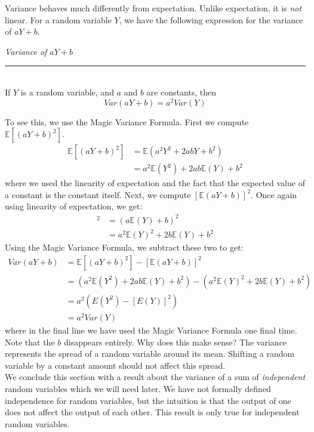 \documentclass[12pt]{article}
\theoremstyle{definition}
\theoremstyle{remark}
\def\E{{\mathbb E}}
\begin{document}
Variance behaves much differently from expectation. Unlike expectation, it is \emph{not} linear. For a random variable $Y$, we have the following expression for the variance of $aY + b$.

\begin{framed}
  \emph{Variance of $aY + b$}\\
  \rule{\dimexpr{}\fboxrule}{.1pt} \\
If $Y$ is a random variable, and $a$ and $b$ are constants, then
\[
Var(aY + b) = a^2 Var(Y)
\]
\end{framed}
To see this, we use the Magic Variance Formula. First we compute $\E[(aY + b)^2]$.
\begin{align*}
\E[(aY +b)^2] &= \E(a^2 Y^2 + 2 a b Y + b^2) \\
&= a^2 \E(Y^2) + 2 a b \E(Y) + b^2
\end{align*}
where we used the linearity of expectation and the fact that the expected value of a constant is the constant itself. Next, we compute $[\E(aY + b)]^2$. Once again using linearity of expectation, we get:
\begin{align*}
[\E(aY + b)]^2 &= (a\E(Y) + b)^2 \\
&= a^2 \E(Y)^2 + 2 b \E(Y) + b^2
\end{align*}
Using the Magic Variance Formula, we subtract these two to get:
\begin{align*}
Var(aY + b) &= \E[(aY +b)^2] - [\E(aY + b)]^2 \\
&= \left( a^2 \E(Y^2) + 2 a b \E(Y) + b^2 \right) - \left( a^2 \E(Y)^2 + 2 b \E(Y) + b^2 \right) \\
&= a^2 \left( E(Y^2) - [E(Y)]^2 \right) \\
&= a^2 Var(Y)
\end{align*}
where in the final line we have used the Magic Variance Formula one final time. \\

Note that the $b$ disappears entirely. Why does this make sense? The variance represents the spread of a random variable around its mean. Shifting a random variable by a constant amount should not affect this spread.\\

We conclude this section with a result about the variance of a sum of \emph{independent} random variables which we will need later. We have not formally defined independence for random variables, but the intuition is that the output of one does not affect the output of each other. This result is only true for independent random variables.
\end{document}
